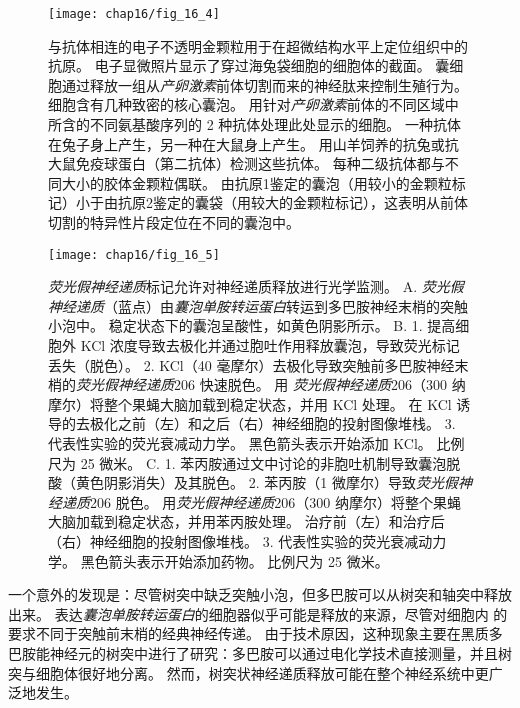 \begin{figure}[htbp]
	\centering
	\texttt{[image: chap16/fig\_16\_4]}
	\caption{与抗体相连的电子不透明金颗粒用于在超微结构水平上定位组织中的抗原。
		电子显微照片显示了穿过海兔袋细胞的细胞体的截面。
		囊细胞通过释放一组从\textit{产卵激素}前体切割而来的神经肽来控制生殖行为。
		细胞含有几种致密的核心囊泡。
		用针对\textit{产卵激素}前体的不同区域中所含的不同氨基酸序列的 2 种抗体处理此处显示的细胞。
		一种抗体在兔子身上产生，另一种在大鼠身上产生。
		用山羊饲养的抗兔或抗大鼠免疫球蛋白（第二抗体）检测这些抗体。
		每种二级抗体都与不同大小的胶体金颗粒偶联。
		由抗原1鉴定的囊泡（用较小的金颗粒标记）小于由抗原2鉴定的囊袋（用较大的金颗粒标记），这表明从前体切割的特异性片段定位在不同的囊泡中。}
	\label{fig:16_4}
\end{figure}



\begin{figure}[htbp]
	\centering
	\texttt{[image: chap16/fig\_16\_5]}
	\caption{\textit{荧光假神经递质}标记允许对神经递质释放进行光学监测。
		A. \textit{荧光假神经递质}（蓝点）由\textit{囊泡单胺转运蛋白}转运到多巴胺神经末梢的突触小泡中。
		稳定状态下的囊泡呈酸性，如黄色阴影所示。
		B. 1. 提高细胞外 KCl 浓度导致去极化并通过胞吐作用释放囊泡，导致荧光标记丢失（脱色）。
		2. KCl（40 毫摩尔）去极化导致突触前多巴胺神经末梢的\textit{荧光假神经递质}206 快速脱色。
		用 \textit{荧光假神经递质}206（300 纳摩尔）将整个果蝇大脑加载到稳定状态，并用 KCl 处理。
		在 KCl 诱导的去极化之前（左）和之后（右）神经细胞的投射图像堆栈。
		3. 代表性实验的荧光衰减动力学。
		黑色箭头表示开始添加 KCl。
		比例尺为 25 微米。
		C. 
		1. 苯丙胺通过文中讨论的非胞吐机制导致囊泡脱酸（黄色阴影消失）及其脱色。
		2. 苯丙胺（1 微摩尔）导致\textit{荧光假神经递质}206 脱色。
		用\textit{荧光假神经递质}206（300 纳摩尔）将整个果蝇大脑加载到稳定状态，并用苯丙胺处理。
		治疗前（左）和治疗后（右）神经细胞的投射图像堆栈。
		3. 代表性实验的荧光衰减动力学。
		黑色箭头表示开始添加药物。
		比例尺为 25 微米。}
	\label{fig:16_5}
\end{figure}


一个意外的发现是：尽管树突中缺乏突触小泡，但多巴胺可以从树突和轴突中释放出来。
表达\textit{囊泡单胺转运蛋白}的细胞器似乎可能是释放的来源，尽管对细胞内  的要求不同于突触前末梢的经典神经传递。
由于技术原因，这种现象主要在黑质多巴胺能神经元的树突中进行了研究：多巴胺可以通过电化学技术直接测量，并且树突与细胞体很好地分离。
然而，树突状神经递质释放可能在整个神经系统中更广泛地发生。



